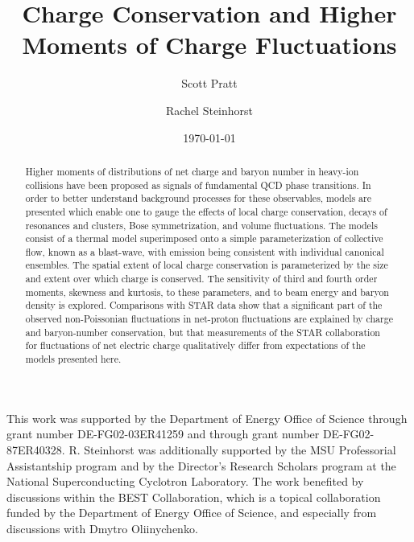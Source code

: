 \documentclass[aps,prc,nofootinbib,showpacs,superscriptaddress,groupedaddress]{revtex4-1}
\begin{document}
\title{Charge Conservation and Higher Moments of Charge Fluctuations}
\author{Scott Pratt}
\author{Rachel Steinhorst}
\date{\today}

\pacs{}

\begin{abstract}
Higher moments of distributions of net charge and baryon number in heavy-ion collisions have been proposed as signals of fundamental QCD phase transitions. In order to better understand background processes for these observables, models are presented which enable one to gauge the effects of local charge conservation, decays of resonances and clusters, Bose symmetrization, and volume fluctuations. The models consist of a thermal model superimposed onto a simple parameterization of collective flow, known as a blast-wave, with emission being consistent with individual canonical ensembles. The spatial extent of local charge conservation is parameterized by the size and extent over which charge is conserved. The sensitivity of third and fourth order moments, skewness and kurtosis, to these parameters, and to beam energy and baryon density is explored. Comparisons with STAR data show that a significant part of the observed non-Poissonian fluctuations in net-proton fluctuations are explained by charge and baryon-number conservation, but that measurements of the STAR collaboration for fluctuations of net electric charge qualitatively differ from expectations of the models presented here.
\end{abstract}

\maketitle

















\begin{acknowledgments}
This work was supported by the Department of Energy Office of Science through grant number DE-FG02-03ER41259 and through grant number DE-FG02-87ER40328. R. Steinhorst was additionally supported by the MSU Professorial Assistantship program and by the Director's Research Scholars program at the National Superconducting Cyclotron Laboratory. The work benefited by discussions within the BEST Collaboration, which is a topical collaboration funded by the Department of Energy Office of Science, and especially from discussions with Dmytro Oliinychenko.
\end{acknowledgments}


\end{document}
